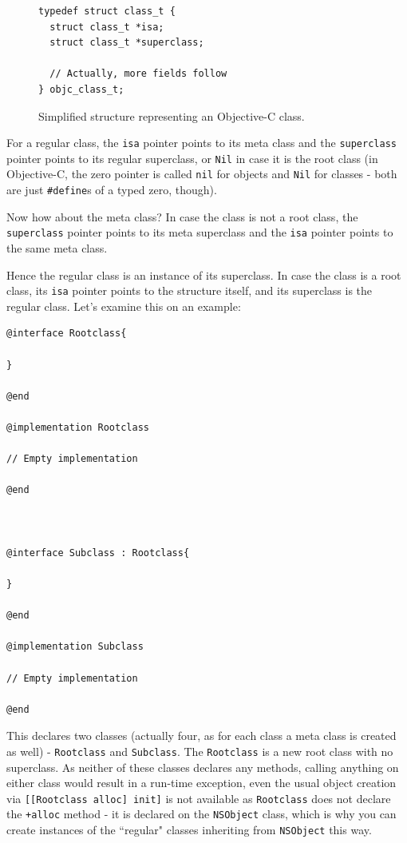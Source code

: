 \begin{figure}[H]
\begin{verbatim}
typedef struct class_t {
  struct class_t *isa;
  struct class_t *superclass;
  
  // Actually, more fields follow
} objc_class_t;
\end{verbatim}
  \centering{}
  \caption{Simplified structure representing an Objective-C class.}
  \label{fig:objc_class_struct_simplified}
\end{figure}

For a regular class, the \verb=isa= pointer points to its meta class and the \verb=superclass= pointer points to its regular superclass, or \verb=Nil= in case it is the root class (in Objective-C, the zero pointer is called \verb=nil= for objects and \verb=Nil= for classes - both are just \verb=#define=s of a typed zero, though). 

Now how about the meta class? In case the class is not a root class, the \verb=superclass= pointer points to its meta superclass and the \verb=isa= pointer points to the same meta class.

Hence the regular class is an instance of its superclass. In case the class is a root class, its \verb=isa= pointer points to the structure itself, and its superclass is the regular class. Let's examine this on an example:

\begin{verbatim}@interface Rootclass{
  
}

@end

@implementation Rootclass

// Empty implementation

@end



@interface Subclass : Rootclass{

}

@end

@implementation Subclass

// Empty implementation

@end 
\end{verbatim}

This declares two classes (actually four, as for each class a meta class is created as well) - \verb=Rootclass= and \verb=Subclass=. The \verb=Rootclass= is a new root class with no superclass. As neither of these classes declares any methods, calling anything on either class would result in a run-time exception, even the usual object creation via \verb=[[Rootclass alloc] init]= is not available as \verb=Rootclass= does not declare the \verb=+alloc= method - it is declared on the \verb=NSObject= class, which is why you can create instances of the ``regular" classes inheriting from \verb=NSObject= this way.

